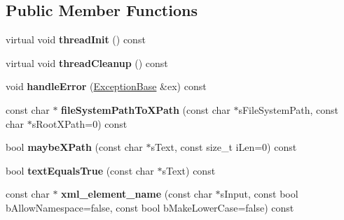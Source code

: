 \subsection*{\-Public \-Member \-Functions}
\begin{DoxyCompactItemize}
\item 
\hypertarget{classgeneral__server_1_1XmlLibrary_adeb99b219b840dd80ab96bba4473f041}{virtual void {\bfseries thread\-Init} () const }\label{classgeneral__server_1_1XmlLibrary_adeb99b219b840dd80ab96bba4473f041}

\item 
\hypertarget{classgeneral__server_1_1XmlLibrary_a7f1c2d71d6ab9148331263bb048458fc}{virtual void {\bfseries thread\-Cleanup} () const }\label{classgeneral__server_1_1XmlLibrary_a7f1c2d71d6ab9148331263bb048458fc}

\item 
\hypertarget{classgeneral__server_1_1XmlLibrary_a44137dd2eb341418abf30d61ba843885}{void {\bfseries handle\-Error} (\hyperlink{classgeneral__server_1_1ExceptionBase}{\-Exception\-Base} \&ex) const }\label{classgeneral__server_1_1XmlLibrary_a44137dd2eb341418abf30d61ba843885}

\item 
\hypertarget{classgeneral__server_1_1XmlLibrary_a6be7b81e5ffecbc70c56ad0c6d80321d}{const char $\ast$ {\bfseries file\-System\-Path\-To\-X\-Path} (const char $\ast$s\-File\-System\-Path, const char $\ast$s\-Root\-X\-Path=0) const }\label{classgeneral__server_1_1XmlLibrary_a6be7b81e5ffecbc70c56ad0c6d80321d}

\item 
\hypertarget{classgeneral__server_1_1XmlLibrary_a22d474be505b8fcc4321b2ae7d129dd3}{bool {\bfseries maybe\-X\-Path} (const char $\ast$s\-Text, const size\-\_\-t i\-Len=0) const }\label{classgeneral__server_1_1XmlLibrary_a22d474be505b8fcc4321b2ae7d129dd3}

\item 
\hypertarget{classgeneral__server_1_1XmlLibrary_a9be62567ce4cbaa36966a86d6e46a368}{bool {\bfseries text\-Equals\-True} (const char $\ast$s\-Text) const }\label{classgeneral__server_1_1XmlLibrary_a9be62567ce4cbaa36966a86d6e46a368}

\item 
\hypertarget{classgeneral__server_1_1XmlLibrary_a4814971f793d2fba92154fe31de4c6a8}{const char $\ast$ {\bfseries xml\-\_\-element\-\_\-name} (const char $\ast$s\-Input, const bool b\-Allow\-Namespace=false, const bool b\-Make\-Lower\-Case=false) const }\label{classgeneral__server_1_1XmlLibrary_a4814971f793d2fba92154fe31de4c6a8}


\end{DoxyCompactItemize}

